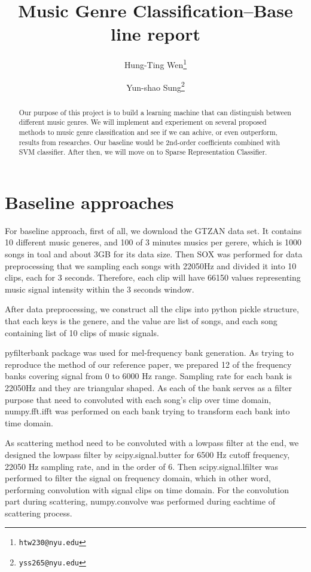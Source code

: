 \documentclass[final]{siamltexmm}
\title{Music Genre Classification--Base line report}
\author{Hung-Ting Wen\thanks{\tt htw230@nyu.edu}
        \and Yun-shao Sung\thanks{\tt yss265@nyu.edu}}
\begin{document}
\maketitle

\begin{abstract}
Our purpose of this project is to build a learning machine that can distinguish between different music genres.  We will implement and experiement on several proposed methods to music genre classification and see if we can achive, or even outperform, results from researches.  Our baseline would be 2nd-order coefficients combined with SVM classifier.  After then, we will move on to Sparse Representation Classifier.
\end{abstract}

\pagestyle{myheadings}
\thispagestyle{plain}

\section{Baseline approaches}
For baseline approach, first of all, we download the GTZAN data set. It contains 10 different music generes, and 100 of 3 minutes musics per gerere, which is 1000 songs in toal and about 3GB for its data size. Then SOX was performed for data preprocessing that we sampling each songs with 22050Hz and divided it into 10 clips, each for 3 seconds. Therefore, each clip will have 66150 values representing music signal intensity within the 3 seconds window.

After data preprocessing, we construct all the clips into python pickle structure, that each keys is the genere, and the value are list of songs, and each song containing list of 10 clips of music signals.

pyfilterbank package was used for mel-frequency bank generation. As trying to reproduce the method of our reference paper, we prepared 12 of the frequency banks covering signal from 0 to 6000 Hz range. Sampling rate for each bank is 22050Hz and they are triangular shaped. As each of the bank serves as a filter purpose that need to convoluted with each song's clip over time domain, numpy.fft.ifft was performed on each bank trying to transform each bank into time domain.

As scattering method need to be convoluted with a lowpass filter at the end, we designed the lowpass filter by scipy.signal.butter for 6500 Hz cutoff frequency, 22050 Hz sampling rate, and in the order of 6. Then scipy.signal.lfilter was performed to filter the signal on frequency domain, which in other word, performing convolution with signal clips on time domain. For the convolution part during scattering, numpy.convolve was performed during eachtime of scattering process.
\end{document}
